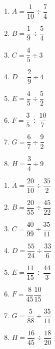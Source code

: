 \documentclass[11pt]{article}
\begin{document}
\begin{exercice}[1]
\begin{multicols}{2}
\begin{enumerate}[itemsep=3em,label={}]
	\item  $A = \dfrac{1}{10} \div \dfrac{7}{4}$ 
	\item  $B = \dfrac{1}{9} \div \dfrac{5}{4}$ 
	\item  $C = \dfrac{4}{5} \div 3$ 
	\item  $D = \dfrac{2}{9} \div 4$ 
	\item  $E = \dfrac{4}{5} \div \dfrac{5}{2}$ 
	\item  $F = \dfrac{3}{5} \div \dfrac{10}{7}$ 
	\item  $G = \dfrac{6}{7} \div \dfrac{9}{2}$ 
	\item  $H = \dfrac{3}{4} \div 9$ 
\end{enumerate}
\end{multicols}
\end{exercice}


\begin{exercice}[2]
\begin{multicols}{2}
\begin{enumerate}[itemsep=3em,label={}]
	\item  $A = \dfrac{20}{10} \div \dfrac{35}{2}$ 
	\item  $B = \dfrac{20}{55} \div \dfrac{45}{22}$ 
	\item  $C = \dfrac{40}{99} \div \dfrac{35}{11}$ 
	\item  $D = \dfrac{55}{24} \div \dfrac{33}{6}$ 
	\item  $E = \dfrac{11}{15} \div \dfrac{44}{3}$ 
	\item  $F = \dfrac{8}{45}\dfrac{10}{15}$ 
	\item  $G = \dfrac{5}{88} \div \dfrac{35}{11}$ 
	\item  $H = \dfrac{16}{45} \div \dfrac{18}{20}$ 
\end{enumerate}
\end{multicols}
\end{exercice}
\end{document}

